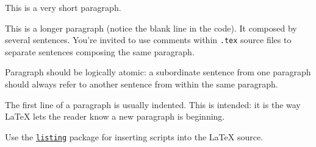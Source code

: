 This is a very short paragraph.

This is a longer paragraph (notice the blank line in the code).
It composed by several sentences.
%
You're invited to use comments within \texttt{.tex} source files to separate sentences composing the same paragraph.

Paragraph should be logically atomic: a subordinate sentence from one paragraph should always refer to another sentence from within the same paragraph.

The first line of a paragraph is usually indented.
%
This is intended: it is the way \LaTeX{} lets the reader know a new paragraph is beginning.

Use the \href{https://en.wikibooks.org/wiki/LaTeX/Source_Code_Listings}{\texttt{listing}} package for inserting scripts into the \LaTeX{} source.
